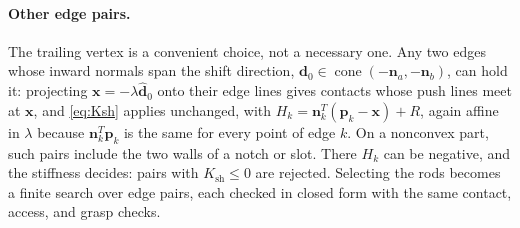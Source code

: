 \paragraph{Other edge pairs.}
The trailing vertex is a convenient choice, not a necessary one. Any two edges whose inward normals span the shift direction, $\mathbf d_0\in\operatorname{cone}(-\mathbf n_a,-\mathbf n_b)$, can hold it: projecting $\mathbf x=-\lambda\hat{\mathbf d}_0$ onto their edge lines gives contacts whose push lines meet at $\mathbf x$, and \eqref{eq:Ksh} applies unchanged, with $H_k=\mathbf n_k^T(\mathbf p_k-\mathbf x)+R$, again affine in $\lambda$ because $\mathbf n_k^T\mathbf p_k$ is the same for every point of edge $k$. On a nonconvex part, such pairs include the two walls of a notch or slot. There $H_k$ can be negative, and the stiffness decides: pairs with $K_{\mathrm{sh}}\leq0$ are rejected. Selecting the rods becomes a finite search over edge pairs, each checked in closed form with the same contact, access, and grasp checks.
